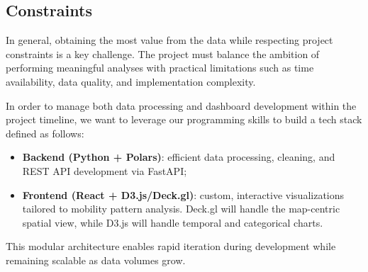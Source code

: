 \subsection{Constraints}
In general, obtaining the most value from the data while respecting project constraints is a key challenge.
The project must balance the ambition of performing meaningful analyses with practical limitations such as time availability, data quality, and implementation complexity. 

In order to manage both data processing and dashboard development within the project timeline, we want to leverage our programming skills to build a tech stack defined as follows:
\begin{itemize}[beginpenalty=10000]
  \item \textbf{Backend (Python + Polars)}: efficient data processing, cleaning, and REST API development via FastAPI;
  \item \textbf{Frontend (React + D3.js/Deck.gl)}: custom, interactive visualizations tailored to mobility pattern analysis.
  Deck.gl will handle the map-centric spatial view, while D3.js will handle temporal and categorical charts.
\end{itemize}
This modular architecture enables rapid iteration during development while remaining scalable as data volumes grow.